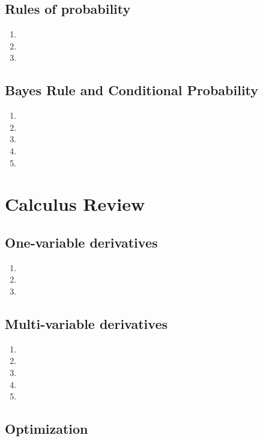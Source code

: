 \documentclass{article}
\begin{document}
\subsection{Rules of probability}

\begin{enumerate}
\item
\item
\item
\end{enumerate}

\subsection{Bayes Rule and Conditional Probability}

\begin{enumerate}
\item
\item
\item
\item
\item
\end{enumerate}

\section{Calculus Review}

\subsection{One-variable derivatives}

\begin{enumerate}
\item
\item
\item
\end{enumerate}

\subsection{Multi-variable derivatives}

\begin{enumerate}
\item
\item
\item
\item
\item
\end{enumerate}

\subsection{Optimization}
\end{document}

